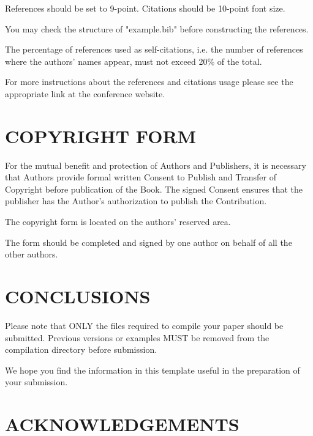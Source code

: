 \documentclass[a4paper,twoside]{article}
\begin{document}
References should be set to 9-point. Citations should be 10-point font size.

You may check the structure of "example.bib" before constructing the references.

The percentage of references used as self-citations, i.e. the number of references where the authors' names appear, must not exceed 20\% of the total.

For more instructions about the references and citations usage please see the appropriate link at the conference website.

\section{\uppercase{Copyright Form}}

For the mutual benefit and protection of Authors and Publishers, it is necessary that Authors provide formal written Consent to Publish and Transfer of Copyright before publication of the Book. The signed Consent ensures that the publisher has the Author's authorization to publish the Contribution.

The copyright form is located on the authors' reserved area.

The form should be completed and signed by one author on behalf of all the other authors.

\section{\uppercase{Conclusions}}
\label{sec:conclusion}

Please note that ONLY the files required to compile your paper should be submitted. Previous versions or examples MUST be removed from the compilation directory before submission.

We hope you find the information in this template useful in the preparation of your submission.


\section*{\uppercase{Acknowledgements}}
\end{document}
